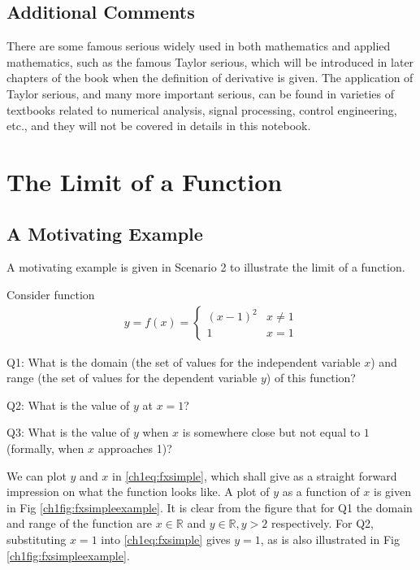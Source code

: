 \subsection{Additional Comments} \label{ch1subsec:additionalcommentssequence}

There are some famous serious widely used in both mathematics and applied mathematics, such as the famous Taylor serious, which will be introduced in later chapters of the book when the definition of derivative is given. The application of Taylor serious, and many more important serious, can be found in varieties of textbooks related to numerical analysis, signal processing, control engineering, etc., and they will not be covered in details in this notebook.

\section{The Limit of a Function}

\subsection{A Motivating Example} \label{ch1subsec:functionmotivatingexample}

A motivating example is given in Scenario 2 to illustrate the limit of a function.

\begin{shortbox}

Consider function
\begin{eqnarray}
  y = f(x) = \left\{\begin{array}{cc}
                    (x-1)^2 & x \neq 1 \\
                    1 & x = 1
                  \end{array}\right. \label{ch1eq:fxsimple}
\end{eqnarray}

Q1: What is the domain (the set of values for the independent variable $x$) and range (the set of values for the dependent variable $y$) of this function?

Q2: What is the value of $y$ at $x = 1$?

Q3: What is the value of $y$ when $x$ is somewhere close but not equal to $1$ (formally, when $x$ approaches 1)?

\end{shortbox}

We can plot $y$ and $x$ in \eqref{ch1eq:fxsimple}, which shall give as a straight forward impression on what the function looks like. A plot of $y$ as a function of $x$ is given in Fig \ref{ch1fig:fxsimpleexample}. It is clear from the figure that for Q1 the domain and range of the function are $x\in \mathbb{R}$ and $y\in \mathbb{R}, y > 2$ respectively. For Q2, substituting $x=1$ into \eqref{ch1eq:fxsimple} gives $y=1$, as is also illustrated in Fig \ref{ch1fig:fxsimpleexample}.


